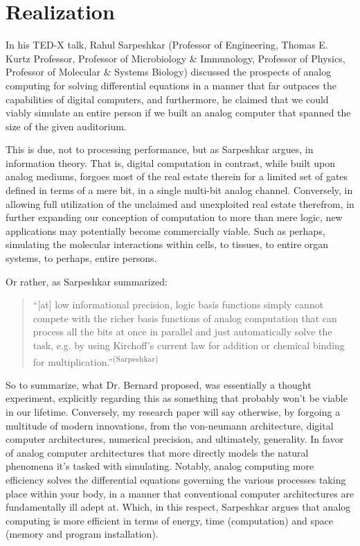 \section*{Realization}

In his TED-X talk, Rahul Sarpeshkar (Professor of Engineering, Thomas E. Kurtz Professor, Professor of Microbiology \& Immunology, Professor of Physics, Professor of Molecular \& Systems Biology) discussed the prospects of analog computing for solving differential equations in a manner that far outpaces the capabilities of digital computers, and furthermore, he claimed that we could viably simulate an entire person if we built an analog computer that spanned the size of the given auditorium.

This is due, not to processing performance, but as Sarpeshkar argues, in information theory. That is, digital computation in contrast, while built upon analog mediums, forgoes most of the real estate therein for a limited set of gates defined in terms of a mere bit, in a single multi-bit analog channel. Conversely, in allowing full utilization of the unclaimed and unexploited real estate therefrom, in further expanding our conception of computation to more than mere logic, new applications may potentially become commercially viable. Such as perhaps, simulating the molecular interactions within cells, to tissues, to entire organ systems, to perhaps, entire persons.

Or rather, as Sarpeshkar summarized:

\begin{quotation}
    ``[at] low informational precision, logic basis functions simply cannot compete with the richer basis functions of analog computation that can process all the bits at once in parallel and just automatically solve the task, e.g. by using Kirchoff’s current law for addition or chemical binding for multiplication.''\textsuperscript{(Sarpeshkar)}
\end{quotation}


So to summarize, what Dr. Bernard proposed, was essentially a thought experiment, explicitly regarding this as something that probably won't be viable in our lifetime. Conversely, my research paper will say otherwise, by forgoing a multitude of modern innovations, from the von-neumann architecture, digital computer architectures, numerical precision, and ultimately, generality. In favor of analog computer architectures that more directly models the natural phenomena it's tasked with simulating.  Notably, analog computing more efficiency solves the differential equations governing the various processes taking place within your body, in a manner that conventional computer architectures are fundamentally ill adept at. Which, in this respect, Sarpeshkar argues that analog computing is more efficient in terms of energy, time (computation) and space (memory and program installation).

